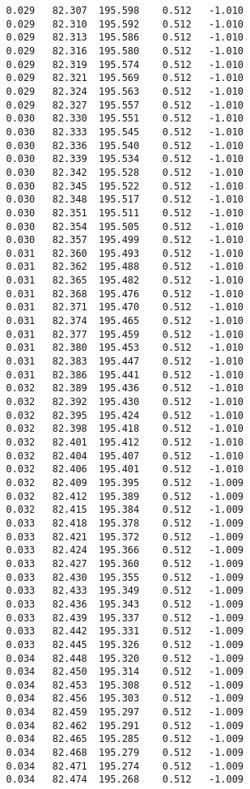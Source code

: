 \begin{verbatim}
   0.029   82.307  195.598    0.512   -1.010
   0.029   82.310  195.592    0.512   -1.010
   0.029   82.313  195.586    0.512   -1.010
   0.029   82.316  195.580    0.512   -1.010
   0.029   82.319  195.574    0.512   -1.010
   0.029   82.321  195.569    0.512   -1.010
   0.029   82.324  195.563    0.512   -1.010
   0.029   82.327  195.557    0.512   -1.010
   0.030   82.330  195.551    0.512   -1.010
   0.030   82.333  195.545    0.512   -1.010
   0.030   82.336  195.540    0.512   -1.010
   0.030   82.339  195.534    0.512   -1.010
   0.030   82.342  195.528    0.512   -1.010
   0.030   82.345  195.522    0.512   -1.010
   0.030   82.348  195.517    0.512   -1.010
   0.030   82.351  195.511    0.512   -1.010
   0.030   82.354  195.505    0.512   -1.010
   0.030   82.357  195.499    0.512   -1.010
   0.031   82.360  195.493    0.512   -1.010
   0.031   82.362  195.488    0.512   -1.010
   0.031   82.365  195.482    0.512   -1.010
   0.031   82.368  195.476    0.512   -1.010
   0.031   82.371  195.470    0.512   -1.010
   0.031   82.374  195.465    0.512   -1.010
   0.031   82.377  195.459    0.512   -1.010
   0.031   82.380  195.453    0.512   -1.010
   0.031   82.383  195.447    0.512   -1.010
   0.031   82.386  195.441    0.512   -1.010
   0.032   82.389  195.436    0.512   -1.010
   0.032   82.392  195.430    0.512   -1.010
   0.032   82.395  195.424    0.512   -1.010
   0.032   82.398  195.418    0.512   -1.010
   0.032   82.401  195.412    0.512   -1.010
   0.032   82.404  195.407    0.512   -1.010
   0.032   82.406  195.401    0.512   -1.010
   0.032   82.409  195.395    0.512   -1.009
   0.032   82.412  195.389    0.512   -1.009
   0.032   82.415  195.384    0.512   -1.009
   0.033   82.418  195.378    0.512   -1.009
   0.033   82.421  195.372    0.512   -1.009
   0.033   82.424  195.366    0.512   -1.009
   0.033   82.427  195.360    0.512   -1.009
   0.033   82.430  195.355    0.512   -1.009
   0.033   82.433  195.349    0.512   -1.009
   0.033   82.436  195.343    0.512   -1.009
   0.033   82.439  195.337    0.512   -1.009
   0.033   82.442  195.331    0.512   -1.009
   0.033   82.445  195.326    0.512   -1.009
   0.034   82.448  195.320    0.512   -1.009
   0.034   82.450  195.314    0.512   -1.009
   0.034   82.453  195.308    0.512   -1.009
   0.034   82.456  195.303    0.512   -1.009
   0.034   82.459  195.297    0.512   -1.009
   0.034   82.462  195.291    0.512   -1.009
   0.034   82.465  195.285    0.512   -1.009
   0.034   82.468  195.279    0.512   -1.009
   0.034   82.471  195.274    0.512   -1.009
   0.034   82.474  195.268    0.512   -1.009

\end{verbatim}

